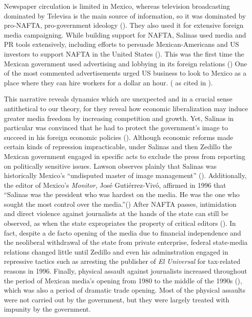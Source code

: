 \documentclass[12pt]{report}
\begin{document}
Newspaper circulation is limited in Mexico, whereas television broadcasting dominated by Televisa is
the main source of information, so it was dominated by pro-NAFTA, pro-government ideology
(\citealt{Hellman:1993wa}). They also used it for extensive foreign media campaigning. While
building support for NAFTA, Salinas used media and PR tools extensively, including efforts to
persuade Mexican-Americans and US investors to support NAFTA in the United States
(\citealt{Morris:2001iy}). This was the first time the Mexican government used advertising and
lobbying in its foreign relations (\citealt{Chabat:1997wj}) One of the most commented advertisements
urged US business to look to Mexico as a place where they can hire workers for a dollar an hour.
(\citealt[105]{center1993trading} as cited in \citealt[45]{Chabat:1997wj}).

This narrative reveals dynamics which are unexpected and in a crucial sense antithetical to our
theory, for they reveal how economic liberalization may induce greater media freedom by increasing
competition and growth. Yet, Salinas in particular was convinced that he had to protect the
government's image to succeed in his foreign economic policies (\citealt[107]{Dominguez:2009wd}).
Although economic reforms made certain kinds of repression impracticable, under Salinas and then
Zedillo the Mexican government engaged in specific acts to exclude the press from reporting on
politically sensitive issues. Lawson observes plainly that Salinas was historically Mexico's
``undisputed master of image management'' (\citealt[39]{lawson2002building}). Additionally, the
editor of Mexico's \emph{Monitor, }José Gutiérrez-Vivó, affirmed in 1996 that ``Salinas was the
president who was hardest on the media. He was the one who sought the most control over the
media.''(\citealt[39]{lawson2002building}) After NAFTA passes, intimidation and direct violence
against journalists at the hands of the state can still be observed, as when the state expropriates
the property of critical editors (\citealt{OrmeJr:1997da}). In fact, despite a de facto opening of
the media due to financial independence and the neoliberal withdrawal of the state from private
enterprise, federal state-media relations changed little until Zedillo and even his adminstration
engaged in repressive tactics such as arresting the publisher of \emph{El Universal} for tax-related
reasons in 1996. Finally, physical assault against journalists increased throughout the period of
Mexican media's opening from 1980 to the middle of the 1990s (\citealt[81]{lawson2002building}),
which was also a period of dramatic trade opening. Most of the physical assaults were not carried
out by the government, but they were largely treated with impunity by the government.
\end{document}
